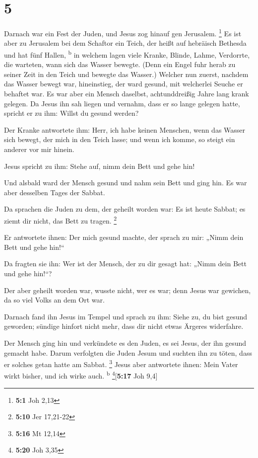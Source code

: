 \hypertarget{section-4}{%
\section{5}\label{section-4}}

 Darnach war ein Fest der Juden, und Jesus zog hinauf gen
Jerusalem. \footnote{\textbf{5:1} Joh 2,13}  Es ist aber
zu Jerusalem bei dem Schaftor ein Teich, der heißt auf hebräisch
Bethesda und hat fünf Hallen, \textsuperscript{b}  in
welchem lagen viele Kranke, Blinde, Lahme, Verdorrte, die warteten, wann
sich das Wasser bewegte.  (Denn ein Engel fuhr herab zu
seiner Zeit in den Teich und bewegte das Wasser.) Welcher nun zuerst,
nachdem das Wasser bewegt war, hineinstieg, der ward gesund, mit
welcherlei Seuche er behaftet war.  Es war aber ein Mensch
daselbst, achtunddreißig Jahre lang krank gelegen.  Da
Jesus ihn sah liegen und vernahm, dass er so lange gelegen hatte,
spricht er zu ihm: Willst du gesund werden?

 Der Kranke antwortete ihm: Herr, ich habe keinen
Menschen, wenn das Wasser sich bewegt, der mich in den Teich lasse; und
wenn ich komme, so steigt ein anderer vor mir hinein.

 Jesus spricht zu ihm: Stehe auf, nimm dein Bett und gehe
hin!

 Und alsbald ward der Mensch gesund und nahm sein Bett und
ging hin. Es war aber desselben Tages der Sabbat.

 Da sprachen die Juden zu dem, der geheilt worden war: Es
ist heute Sabbat; es ziemt dir nicht, das Bett zu tragen. \footnote{\textbf{5:10}
  Jer 17,21-22}

 Er antwortete ihnen: Der mich gesund machte, der sprach
zu mir: „Nimm dein Bett und gehe hin!{}``

 Da fragten sie ihn: Wer ist der Mensch, der zu dir
gesagt hat: „Nimm dein Bett und gehe hin!{}``?

 Der aber geheilt worden war, wusste nicht, wer es war;
denn Jesus war gewichen, da so viel Volks an dem Ort war.

 Darnach fand ihn Jesus im Tempel und sprach zu ihm:
Siehe zu, du bist gesund geworden; sündige hinfort nicht mehr, dass dir
nicht etwas Ärgeres widerfahre.

 Der Mensch ging hin und verkündete es den Juden, es sei
Jesus, der ihn gesund gemacht habe.  Darum verfolgten die
Juden Jesum und suchten ihn zu töten, dass er solches getan hatte am
Sabbat. \footnote{\textbf{5:16} Mt 12,14}  Jesus aber
antwortete ihnen: Mein Vater wirkt bisher, und ich wirke auch.
\textsuperscript{b} \footnote{\textbf{5:20} Joh 3,35}{[}\textbf{5:17}
Joh 9,4{]}

